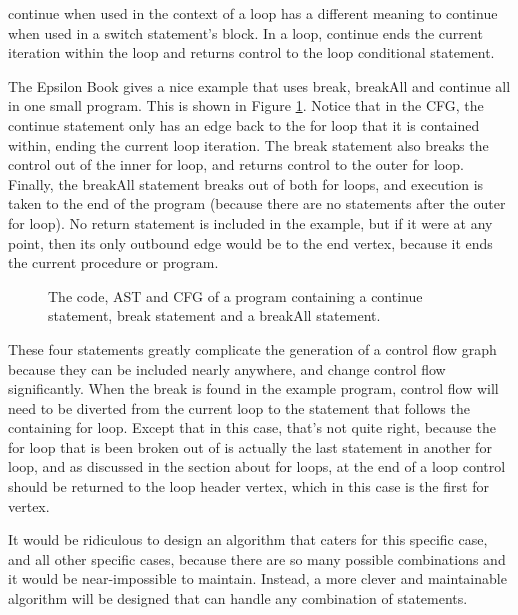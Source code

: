 continue when used in the context of a loop has a different meaning to continue when used in a switch statement's block. In a loop, continue ends the current iteration within the loop and returns control to the loop conditional statement. 

The Epsilon Book \citet{epsilonBook} gives a nice example that uses break, breakAll and continue all in one small program. This is shown in Figure \ref{fig:break}. Notice that in the CFG, the continue statement only has an edge back to the for loop that it is contained within, ending the current loop iteration. The break statement also breaks the control out of the inner for loop, and returns control to the outer for loop. Finally, the breakAll statement breaks out of both for loops, and execution is taken to the end of the program (because there are no statements after the outer for loop). No return statement is included in the example, but if it were at any point, then its only outbound edge would be to the end vertex, because it ends the current procedure or program.

\begin{figure}
\centering
\begin{minipage}{.6\textwidth}
  \centering
  
\end{minipage}%
\begin{minipage}{.3\textwidth}
  \centering
\end{minipage}
\caption{The code, AST and CFG of a program containing a continue statement, break statement and a breakAll statement.}
\label{fig:break}
\end{figure}

These four statements greatly complicate the generation of a control flow graph because they can be included nearly anywhere, and change control flow significantly. When the break is found in the example program, control flow will need to be diverted from the current loop to the statement that follows the containing for loop. Except that in this case, that's not quite right, because the for loop that is been broken out of is actually the last statement in another for loop, and as discussed in the section about for loops, at the end of a loop control should be returned to the loop header vertex, which in this case is the first for vertex.

It would be ridiculous to design an algorithm that caters for this specific case, and all other specific cases, because there are so many possible combinations and it would be near-impossible to maintain. Instead, a more clever and maintainable algorithm will be designed that can handle any combination of statements.